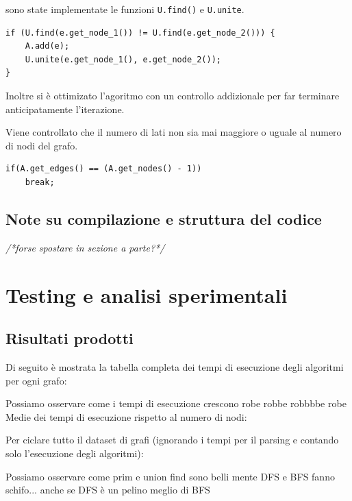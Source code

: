 \documentclass[]{article}
\begin{document}
\begin{flushleft}
\smallskip
sono state implementate le funzioni \verb|U.find()| e \verb|U.unite|.

\lstset{language=c++, style=mystyle, firstnumber=9} 	 	
\begin{lstlisting}
if (U.find(e.get_node_1()) != U.find(e.get_node_2())) {
	A.add(e);
    U.unite(e.get_node_1(), e.get_node_2());
}
\end{lstlisting}

\medskip
Inoltre si è ottimizato l'agoritmo con un controllo addizionale per far terminare anticipatamente l'iterazione. 

Viene controllato che il numero di lati non sia mai maggiore o uguale al numero di nodi del grafo.

\lstset{language=c++, style=mystyle, firstnumber=13}
\begin{lstlisting}
if(A.get_edges() == (A.get_nodes() - 1))
    break;
\end{lstlisting}
\end{flushleft}
\subsection{Note su compilazione e struttura del codice}
\textit{/*forse spostare in sezione a parte?*/}
\section{Testing e analisi sperimentali}
\subsection{Risultati prodotti}
\begin{flushleft}
Di seguito è mostrata la tabella completa dei tempi di esecuzione degli algoritmi per ogni grafo:

Possiamo osservare come i tempi di esecuzione crescono robe robbe robbbbe robe\\

Medie dei tempi di esecuzione rispetto al numero di nodi:


Per ciclare tutto il dataset di grafi (ignorando i tempi per il parsing e contando solo l'esecuzione degli algoritmi):

Possiamo osservare come prim e union find sono belli mente DFS e BFS fanno schifo... anche se DFS è un pelino meglio di BFS

\end{flushleft}

\newpage
\end{document}
